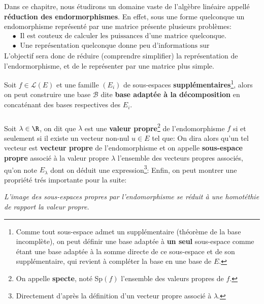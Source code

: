 \chapter*{}
Dans ce chapitre, nous étudirons un domaine vaste de l'algèbre linéaire appellé \textbf{réduction des endormorphismes}.\+
En effet, sous une forme quelconque un endomorphisme représenté par une matrice présente plusieurs problèmes:
\begin{align*}
   &\bullet \;\; \text{Il est couteux de calculer les puissances d'une matrice quelconque.} \\
   &\bullet \;\; \text{Une représentation quelconque donne peu d'informations sur l'endomorphisme.}
\end{align*}
L'objectif sera donc de réduire (comprendre simplifier) la représentation de l'endormorphisme, et de le représenter par une matrice plus simple. \<

Soit \(f \in \mathcal{L}(E)\) et une famille \((E_i)\) de sous-espaces \textbf{supplémentaires}\footnote[1]{Comme tout sous-espace admet un supplémentaire (théorème de la base incomplète), on peut définir une base adaptée à \textbf{un seul} sous-espace comme étant une base adaptée à la somme directe de ce sous-espace et de son supplémentaire, qui revient à compléter la base en une base de \(E\).}, alors on peut construire une base \(\mathcal{B}\) dite \textbf{base adaptée à la décomposition} en concaténant des bases respectives des \(E_i\).

\subsection*{}
Soit \(\lambda \in \R\), on dit que \(\lambda\) est une \textbf{valeur propre}\footnote[2]{On appelle \textbf{specte}, noté Sp\((f)\) l'ensemble des valeurs propres de \(f\).} de l'endomorphisme \(f\) si et seulement si il existe un vecteur non-nul \(u \in E\) tel que:
On dira alors qu'un tel vecteur est \textbf{vecteur propre} de l'endomorphisme et on appelle \textbf{sous-espace propre} associé à la valeur propre \(\lambda\) l'ensemble des vecteurs propres associés, qu'on note \(E_\lambda\) dont on déduit une expression\footnote[3]{Directement d'après la définition d'un vecteur propre associé à \(\lambda\).}:
Enfin, on peut montrer une propriété trés importante pour la suite:
\begin{center}
   \textit{L'image des sous-espaces propres par l'endomorphisme se réduit à une homotéthie de rapport la valeur propre.}
\end{center}

